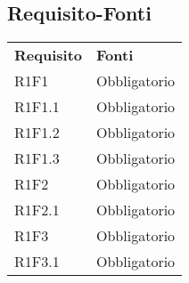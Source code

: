 \subsection{Requisito-Fonti}
\begin{center}
	
	\begin{longtable}{ >{\centering}p{}
			>{\centering}p{}}
		
		\rowcolorhead 
		\textbf{\color{white}Requisito}
		& \textbf{\color{white}Fonti} 
		\tabularnewline 	
		
		R1F1 & Obbligatorio 
		\tabularnewline
		R1F1.1 & Obbligatorio 
		\tabularnewline
		R1F1.2 & Obbligatorio 
		\tabularnewline
		R1F1.3 & Obbligatorio 
		\tabularnewline
		
		R1F2 & Obbligatorio 
		\tabularnewline
		R1F2.1 & Obbligatorio 
		\tabularnewline
		R1F3 & Obbligatorio 
		\tabularnewline 
		R1F3.1 & Obbligatorio 
		\tabularnewline
		
		
		
		
	\end{longtable}
\end{center}


